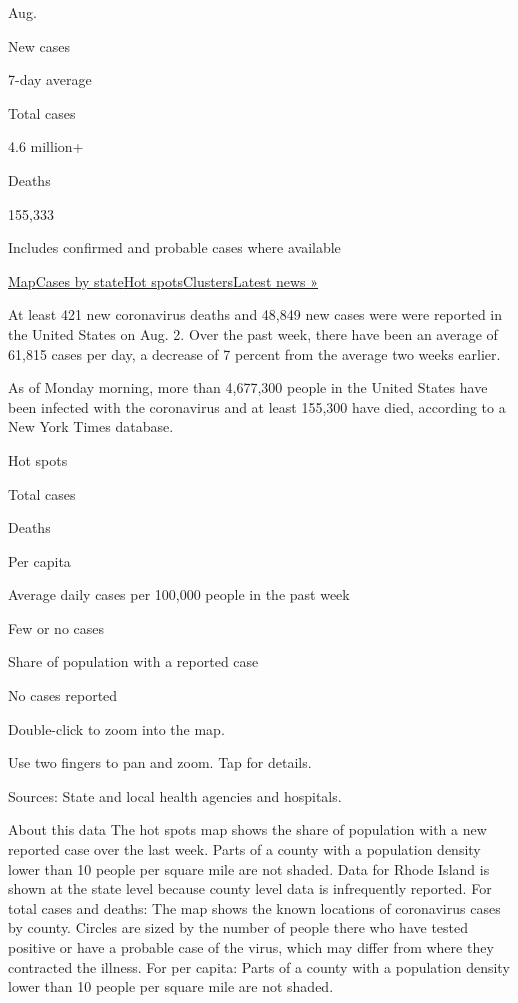 Aug.

New cases

7-day average

Total cases

4.6 million+

Deaths

155,333

Includes confirmed and probable cases where available

\protect\hyperlink{map}{Map}\protect\hyperlink{states}{Cases by
state}\protect\hyperlink{hotspots}{Hot
spots}\protect\hyperlink{clusters}{Clusters}\href{https://www.nytimes.com/2020/08/02/world/coronavirus-covid-19.html}{Latest
news »}

At least 421 new coronavirus deaths and 48,849 new cases were were
reported in the United States on Aug. 2. Over the past week, there have
been an average of 61,815 cases per day, a decrease of 7 percent from
the average two weeks earlier.

As of Monday morning, more than 4,677,300 people in the United States
have been infected with the coronavirus and at least 155,300 have died,
according to a New York Times database.

Hot spots

Total cases

Deaths

Per capita

Average daily cases per 100,000 people in the past week

Few or no cases

Share of population with a reported case

No cases reported

Double-click to zoom into the map.

Use two fingers to pan and zoom. Tap for details.

Sources: State and local health agencies and hospitals.

About this data The hot spots map shows the share of population with a
new reported case over the last week. Parts of a county with a
population density lower than 10 people per square mile are not shaded.
Data for Rhode Island is shown at the state level because county level
data is infrequently reported. For total cases and deaths: The map shows
the known locations of coronavirus cases by county. Circles are sized by
the number of people there who have tested positive or have a probable
case of the virus, which may differ from where they contracted the
illness. For per capita: Parts of a county with a population density
lower than 10 people per square mile are not shaded.


